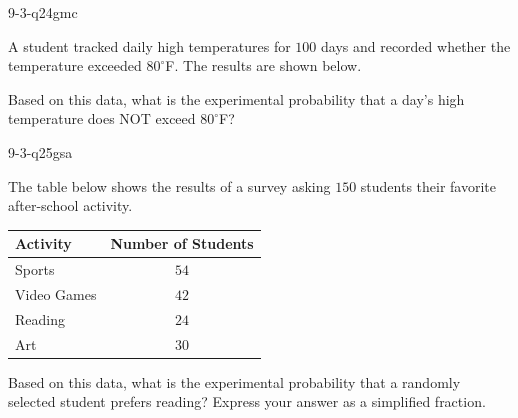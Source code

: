 \begin{practiceQuestion}{9-3-q24}{gmc}
\begin{questionText}
A student tracked daily high temperatures for $100$ days and recorded whether the temperature exceeded $80^\circ$F. The results are shown below.

\begin{center}
\end{center}

Based on this data, what is the experimental probability that a day's high temperature does NOT exceed $80^\circ$F?
\end{questionText}
\end{practiceQuestion}


\begin{practiceQuestion}{9-3-q25}{gsa}
\begin{questionText}
The table below shows the results of a survey asking $150$ students their favorite after-school activity.

\begin{center}
\begin{tabular}{|l|c|}
\hline
\textbf{Activity} & \textbf{Number of Students} \\
\hline
Sports & $54$ \\
\hline
Video Games & $42$ \\
\hline
Reading & $24$ \\
\hline
Art & $30$ \\
\hline
\end{tabular}
\end{center}

Based on this data, what is the experimental probability that a randomly selected student prefers reading? Express your answer as a simplified fraction.
\end{questionText}
\end{practiceQuestion}

